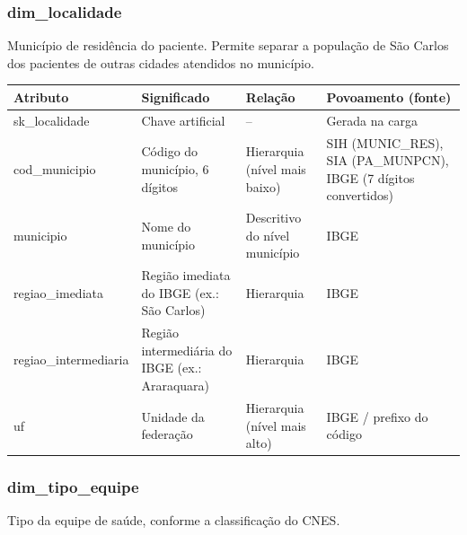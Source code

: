\documentclass[12pt,a4paper]{article}
\begin{document}
\subsubsection*{dim\_\allowbreak{}localidade}

Município de residência do paciente. Permite separar a população de São Carlos dos pacientes de outras cidades atendidos no município.


{\small{}\begin{longtable}{|>{\raggedright\arraybackslash}p{}|>{\raggedright\arraybackslash}p{}|>{\raggedright\arraybackslash}p{}|>{\raggedright\arraybackslash}p{}|}\hline\rowcolor{azul}\color{white}\bfseries Atributo & \color{white}\bfseries Significado & \color{white}\bfseries Relação & \color{white}\bfseries Povoamento (fonte) \\ \hline\endhead
sk\_\allowbreak{}localidade & Chave artificial & – & Gerada na carga \\ \hline
cod\_\allowbreak{}municipio & Código do município, 6 dígitos & Hierarquia (nível mais baixo) & SIH (MUNIC\_\allowbreak{}RES), SIA (PA\_\allowbreak{}MUNPCN), IBGE (7 dígitos convertidos) \\ \hline
municipio & Nome do município & Descritivo do nível município & IBGE \\ \hline
regiao\_\allowbreak{}imediata & Região imediata do IBGE (ex.: São Carlos) & Hierarquia & IBGE \\ \hline
regiao\_\allowbreak{}intermediaria & Região intermediária do IBGE (ex.: Araraquara) & Hierarquia & IBGE \\ \hline
uf & Unidade da federação & Hierarquia (nível mais alto) & IBGE / prefixo do código \\ \hline\end{longtable}}

\subsubsection*{dim\_\allowbreak{}tipo\_\allowbreak{}equipe}

Tipo da equipe de saúde, conforme a classificação do CNES.
\end{document}

